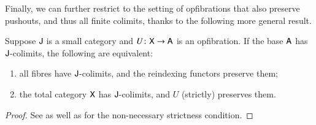 \documentclass[reqno]{amsart}
\begin{document}
Finally, we can further restrict to the setting of opfibrations that also preserve pushouts, and thus all finite colimits, thanks to the following more general result.

\begin{lem} \label{lem:fibrewiselimits}
Suppose $\mathsf{J}$ is a small category and $U\colon\mathsf{X}\to\mathsf{A}$ is an opfibration. If the base $\mathsf{A}$ has $\mathsf{J}$-colimits,
the following are equivalent:
\begin{enumerate}
 \item all fibres have $\mathsf{J}$-colimits, and the reindexing functors preserve them;
 \item the total category $\mathsf{X}$ has $\mathsf{J}$-colimits, and $U$ (strictly) preserves them.
\end{enumerate}
\end{lem}

\begin{proof}
See \cite[Corollary~4.9]{Hermida1999} as well as \cite[Remark~4.11]{Hermida1999} for the non-necessary strictness condition.
\end{proof}
\end{document}
